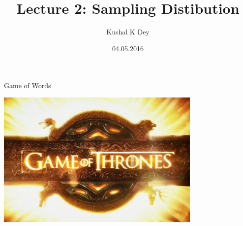 \documentclass{beamer}\usepackage[]{graphicx}\usepackage[]{color}
\title{Lecture 2: Sampling Distibution}
\author{Kushal K Dey}
\date{04.05.2016}
\begin{document}





\begin{frame}{}
\maketitle
\end{frame}


\begin{frame}[fragile]{Game of Words \;\;}
\vskip0.25cm

\includegraphics[width=10cm,keepaspectratio]{game-of-thrones.jpg}

\end{frame}
\end{document}
